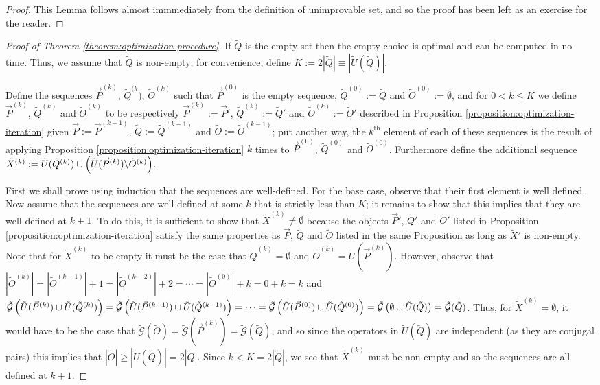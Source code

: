 \documentclass[twocolumn,showpacs,preprintnumbers,amsmath,amssymb,nofootinbib,pra,floatfix]{revtex4-1}
\newcommand{\lst}{\vec}
\newcommand{\set}{\tilde}
\newcommand{\genfun}{\tilde{\mathcal{G}}}
\begin{document}
\begin{proof}
This Lemma follows almost immmediately from the definition of unimprovable set, and so the proof has been left as an exercise for the reader.
\end{proof}
\begin{proof}[Proof of Theorem \ref{theorem:optimization procedure}]
If $\set Q$ is the empty set then the empty choice is optimal and can be computed in no time.  Thus,  we assume that $\set Q$ is non-empty;  for convenience, define $K := 2|\set Q|\equiv |\set U(\set Q)|$.

Define the sequences $\lst P^{(k)}$, $\set Q^{(k})$, $\set O^{(k)}$ such that $\lst P^{(0)}$ is the empty sequence, $\set Q^{(0)}:=\set Q$ and $\set O^{(0)}:=\emptyset$, and for $0<k\le K$ we define $\lst P^{(k)}$, $\set Q^{(k)}$ and $\set O^{(k)}$ to be respectively $\lst P^{(k)}:=\lst P'$, $\set Q^{(k)}:=\set Q'$ and $\set O^{(k)}:=\set O'$ described in Proposition \ref{proposition:optimization-iteration} given $\lst P:=\lst P^{(k-1)}$, $\set Q:=\set Q^{(k-1)}$ and $\set O:=\set O^{(k-1)}$;  put another way, the $k^{\text{th}}$ element of each of these sequences is the result of applying Proposition \ref{proposition:optimization-iteration} $k$ times to $\lst P^{(0)}$, $\set Q^{(0)}$ and $\set O^{(0)}$.  Furthermore define the additional sequence $\set X^{(k)}:=\set U(\set Q^{(k)})\cup\paren{\set U(\lst P^{(k)})\backslash\set O^{(k)}}$.

First we shall prove using induction that the sequences are well-defined.  For the base case, observe that their first element is well defined.  Now assume that the sequences are well-defined at some $k$ that is strictly less than $K$;  it remains to show that this implies that they are well-defined at $k+1$.  To do this, it is sufficient to show that $\set X^{(k)}\ne\emptyset$ because the objects $\lst P'$, $\set Q'$ and $\set O'$ listed in Proposition \ref{proposition:optimization-iteration} satisfy the same properties as $\lst P$, $\set Q$ and $\set O$ listed in the same Proposition as long as $\set X'$ is non-empty.  Note that for $\set X^{(k)}$ to be empty it must be the case that $\set Q^{(k)}=\emptyset$ and $\set O^{(k)} = \set U(\lst P^{(k)})$.  However, observe that $|\set O^{(k)}|=|\set O^{(k-1)}|+1=|\set O^{(k-2)}|+2=\cdots=|\set O^{(0)}|+k=0+k=k$ and 
$\genfun\paren{\set U(\lst P^{(k)})\cup\set U(\set Q^{(k)})}=\genfun\paren{\set U(\lst P^{(k-1)})\cup\set U(\set Q^{(k-1)})}=\cdots=\genfun\paren{\set U(\lst P^{(0)})\cup\set U(\set Q^{(0)})}=\genfun\paren{\emptyset\cup\set U(\set Q)}=\genfun(\set Q)$.  Thus, for $\set X^{(k)}=\emptyset$, it would have to be the case that $\genfun(\set O) = \genfun(\lst P^{(k)}) = \genfun(\set Q)$, and so since the operators in $\set U(\set Q)$ are independent (as they are conjugal pairs) this implies that  $|\set O|\ge |\set U(\set Q)| = 2|\set Q|$.  Since $k<K=2|\set Q|$, we see that $\set X^{(k)}$ must be non-empty and so the sequences are all defined at $k+1$.


\end{proof}
\end{document}
